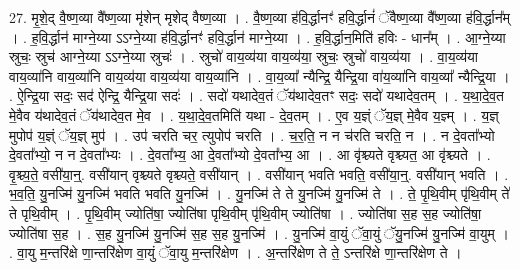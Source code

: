 \documentclass[17pt]{extarticle}
\begin{document}
27. मृ॒शे॒द् वै॒ष्ण॒व्या वै᳚ष्ण॒व्या मृ॑शेन् मृशेद् वैष्ण॒व्या । . वै॒ष्ण॒व्या ह॑वि॒र्द्धानꣳ॑ हवि॒र्द्धानं॑ ॅवैष्ण॒व्या वै᳚ष्ण॒व्या ह॑वि॒र्द्धान᳚म् । . ह॒वि॒र्द्धान॑ माग्ने॒य्या ऽऽग्ने॒य्या ह॑वि॒र्द्धानꣳ॑ हवि॒र्द्धान॑ माग्ने॒य्या । . ह॒वि॒र्द्धान॒मिति॑ हविः - धान᳚म् । . आ॒ग्ने॒य्या स्रुचः॒ स्रुच॑ आग्ने॒य्या ऽऽग्ने॒य्या स्रुचः॑ । . स्रुचो॑ वाय॒व्य॑या वाय॒व्य॑या॒ स्रुचः॒ स्रुचो॑ वाय॒व्य॑या । . वा॒य॒व्य॑या वाय॒व्या॑नि वाय॒व्या॑नि वाय॒व्य॑या वाय॒व्य॑या वाय॒व्या॑नि । . वा॒य॒व्या᳚ न्यैन्द्रि॒ यैन्द्रि॒या वा॑य॒व्या॑नि वाय॒व्या᳚ न्यैन्द्रि॒या । . ऐ॒न्द्रि॒या सदः॒ सद॑ ऐन्द्रि॒ यैन्द्रि॒या सदः॑ । . सदो॑ यथादेव॒तं ॅय॑थादेव॒तꣳ सदः॒ सदो॑ यथादेव॒तम् । . य॒था॒दे॒व॒त मे॒वैव य॑थादेव॒तं ॅय॑थादेव॒त मे॒व । . य॒था॒दे॒व॒तमिति॑ यथा - दे॒व॒तम् । . ए॒व य॒ज्ञ्ं ॅय॒ज्ञ् मे॒वैव य॒ज्ञ्म् । . य॒ज्ञ् मुपोप॑ य॒ज्ञ्ं ॅय॒ज्ञ् मुप॑ । . उप॑ चरति चर॒ त्युपोप॑ चरति । . च॒र॒ति॒ न न च॑रति चरति॒ न । . न दे॒वता᳚भ्यो दे॒वता᳚भ्यो॒ न न दे॒वता᳚भ्यः । . दे॒वता᳚भ्य॒ आ दे॒वता᳚भ्यो दे॒वता᳚भ्य॒ आ । . आ वृ॑श्च्यते वृश्च्यत॒ आ वृ॑श्च्यते । . वृ॒श्च्य॒ते॒ वसी॑या॒न्॒. वसी॑यान् वृश्च्यते वृश्च्यते॒ वसी॑यान् । . वसी॑यान् भवति भवति॒ वसी॑या॒न्॒. वसी॑यान् भवति । . भ॒व॒ति॒ यु॒नज्मि॑ यु॒नज्मि॑ भवति भवति यु॒नज्मि॑ । . यु॒नज्मि॑ ते ते यु॒नज्मि॑ यु॒नज्मि॑ ते । . ते॒ पृ॒थि॒वीम् पृ॑थि॒वीम् ते॑ ते पृथि॒वीम् । . पृ॒थि॒वीम् ज्योति॑षा॒ ज्योति॑षा पृथि॒वीम् पृ॑थि॒वीम् ज्योति॑षा । . ज्योति॑षा स॒ह स॒ह ज्योति॑षा॒ ज्योति॑षा स॒ह । . स॒ह यु॒नज्मि॑ यु॒नज्मि॑ स॒ह स॒ह यु॒नज्मि॑ । . यु॒नज्मि॑ वा॒युं ॅवा॒युं ॅयु॒नज्मि॑ यु॒नज्मि॑ वा॒युम् । . वा॒यु म॒न्तरि॑क्षे णा॒न्तरि॑क्षेण वा॒युं ॅवा॒यु म॒न्तरि॑क्षेण । . अ॒न्तरि॑क्षेण ते ते॒ ऽन्तरि॑क्षे णा॒न्तरि॑क्षेण ते । \newline
\end{document}
